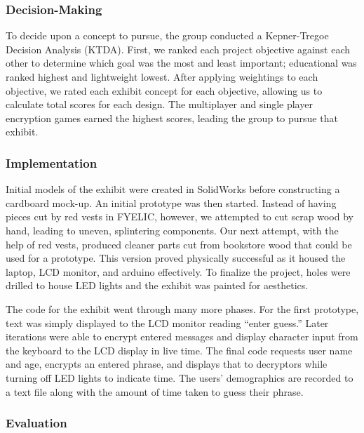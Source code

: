 \documentclass[conference]{IEEEtran}
\begin{document}
\subsubsection{Decision-Making}

\par To decide upon a concept to pursue, the group conducted a Kepner-Tregoe Decision Analysis (KTDA).  First, we ranked each project objective against each other to determine which goal was the most and least important; educational was ranked highest and lightweight lowest.  After applying weightings to each objective, we rated each exhibit concept for each objective, allowing us to calculate total scores for each design.  The multiplayer and single player encryption games earned the highest scores, leading the group to pursue that exhibit. 

\subsubsection{Implementation}

\par Initial models of the exhibit were created in SolidWorks before constructing a cardboard mock-up.  An initial prototype was then started.  Instead of having pieces cut by red vests in FYELIC, however, we attempted to cut scrap wood by hand, leading to uneven, splintering components.  Our next attempt, with the help of red vests, produced cleaner parts cut from bookstore wood that could be used for a prototype.  This version proved physically successful as it housed the laptop, LCD monitor, and arduino effectively.  To finalize the project, holes were drilled to house LED lights and the exhibit was painted for aesthetics.  
    \par The code for the exhibit went through many more phases.  For the first prototype, text was simply displayed to the LCD monitor reading ``enter guess.''  Later iterations were able to encrypt entered messages and display character input from the keyboard to the LCD display in live time.  The final code requests user name and age, encrypts an entered phrase, and displays that to decryptors while turning off LED lights to indicate time.  The users’ demographics are recorded to a text file along with the amount of time taken to guess their phrase.  

\subsubsection{Evaluation}
\end{document}
